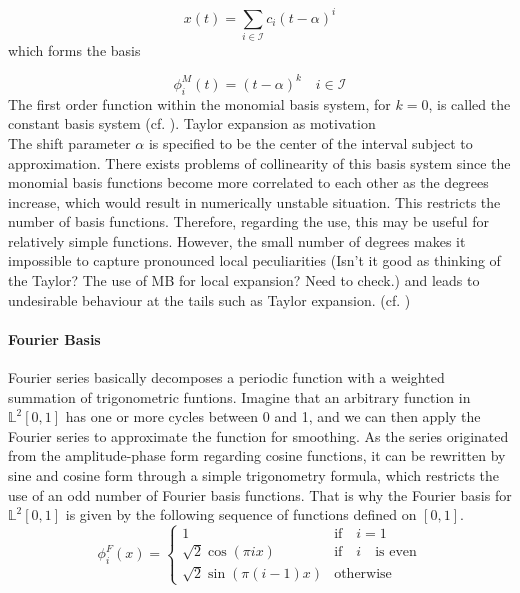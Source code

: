 \documentclass[11pt,twoside,a4paper]{article}
\begin{document}
	\begin{equation}
		x(t) = \sum_{i \in \mathcal{I}} c_i(t - \alpha)^{i}
	\end{equation}
	 which forms the basis 
	
	\begin{equation}
		\phi_{i}^{M}(t) = (t-\alpha)^k \quad i \in \mathcal{I}
	\end{equation}
	The first order function within the monomial basis system, for $k=0$, is called the constant basis system (cf. \cite{horvath_inference_2012}). {\color{blue} Taylor expansion as motivation}\\ 
	The shift parameter $\alpha$ is specified to be the center of the interval subject to approximation.
	 There exists problems of collinearity of this basis system since the monomial basis functions become more correlated to each other as the degrees increase, which would result in numerically unstable situation. This restricts the number of basis functions. Therefore, regarding the use, this may be useful for relatively simple functions. However, the small number of degrees makes it impossible to capture pronounced local peculiarities {\color{orange} (Isn't it good as thinking of the Taylor? The use of MB for local expansion? Need to check.)} and leads to undesirable behaviour at the tails such as Taylor expansion. (cf. \cite{ramsay_functional_2005})


	
	\paragraph{Fourier Basis}
	Fourier series basically decomposes a periodic function with a weighted summation of trigonometric funtions. Imagine that an arbitrary function in $\mathbb{L}^2[0,1]$ has one or more cycles between 0 and 1, and we can then apply the Fourier series to approximate the function for smoothing. As the series originated from the amplitude-phase form regarding cosine functions, it can be rewritten by sine and cosine form through a simple trigonometry formula, which restricts the use of an odd number of Fourier basis functions. That is why the Fourier basis for $\mathbb{L}^2[0,1]$ is given by the following sequence of functions defined on $[0,1]$.
	\begin{equation}
		\phi_{i}^{F}(x) = 
		\begin{cases}
			1 & \text{if} \quad i = 1\\
			\sqrt{2} \cos(\pi i x) & \text{if} \quad i \quad \text{is even} \\
			\sqrt{2} \sin(\pi (i-1)x) & \text{otherwise}
		\end{cases}
	\end{equation}
	
\end{document}
